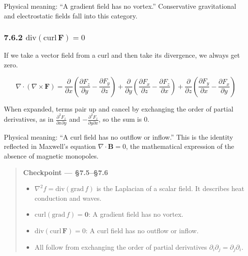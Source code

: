 Physical meaning: ``A gradient field has no vortex.'' Conservative
gravitational and electrostatic fields fall into this category.

\hypertarget{mathrmdivmathrmcurlmathbff-0}{%
\subsubsection{\texorpdfstring{7.6.2
\(\mathrm{div}(\mathrm{curl}\,\mathbf{F}) = 0\)}{7.6.2 \textbackslash mathrm\{div\}(\textbackslash mathrm\{curl\}\textbackslash,\textbackslash mathbf\{F\}) = 0}}\label{mathrmdivmathrmcurlmathbff-0}}

If we take a vector field from a curl and then take its divergence, we
always get zero.

\[\nabla \cdot (\nabla \times \mathbf{F}) = \frac{\partial}{\partial x}\!\left(\frac{\partial F_z}{\partial y} - \frac{\partial F_y}{\partial z}\right) + \frac{\partial}{\partial y}\!\left(\frac{\partial F_x}{\partial z} - \frac{\partial F_z}{\partial x}\right) + \frac{\partial}{\partial z}\!\left(\frac{\partial F_y}{\partial x} - \frac{\partial F_x}{\partial y}\right)\]

When expanded, terms pair up and cancel by exchanging the order of
partial derivatives, as in
\(\frac{\partial^2 F_z}{\partial x\partial y}\) and
\(-\frac{\partial^2 F_z}{\partial y\partial x}\), so the sum is \(0\).

Physical meaning: ``A curl field has no outflow or inflow.'' This is the
identity reflected in Maxwell's equation \(\nabla\cdot\mathbf B=0\), the
mathematical expression of the absence of magnetic monopoles.

\begin{quote}
\textbf{Checkpoint — §7.5–§7.6}

\begin{itemize}
\item
  \(\nabla^2 f = \mathrm{div}(\mathrm{grad}\,f)\) is the Laplacian of a
  scalar field. It describes heat conduction and waves.
\item
  \(\mathrm{curl}(\mathrm{grad}\,f) = \mathbf{0}\): A gradient field has
  no vortex.
\item
  \(\mathrm{div}(\mathrm{curl}\,\mathbf{F}) = 0\): A curl field has no
  outflow or inflow.
\item
  All follow from exchanging the order of partial derivatives
  \(\partial_i\partial_j = \partial_j\partial_i\).
\end{itemize}
\end{quote}

